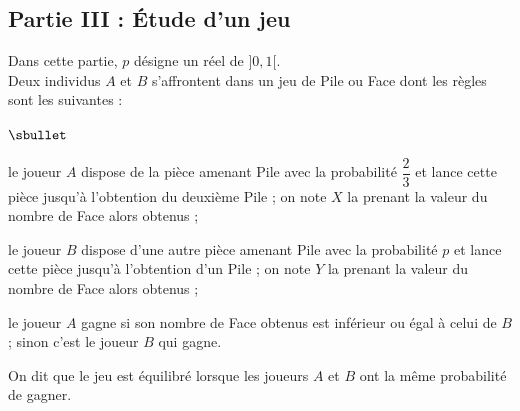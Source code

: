 \subsection*{Partie III : Étude d'un jeu}

\noindent
Dans cette partie, $p$ désigne un réel de $]0,1[$.\\[.1cm]
Deux individus $A$ et $B$ s'affrontent dans un jeu de Pile ou Face dont 
les règles sont les suivantes :
\begin{noliste}{$\sbullet$}
  \item le joueur $A$ dispose de la pièce amenant Pile avec la 
  probabilité $\dfrac{2}{3}$ et lance cette pièce jusqu'à l'obtention 
  du deuxième Pile ; on note $X$ la \var prenant la 
  valeur du nombre de Face alors obtenus ;
  
  \item le joueur $B$ dispose d'une autre pièce amenant Pile avec la
  probabilité $p$ et lance cette pièce jusqu'à l'obtention d'un Pile ;
  on note $Y$ la \var prenant la valeur du nombre de 
  Face alors obtenus ;
  
  \item le joueur $A$ gagne si son nombre de Face obtenus est inférieur
  ou égal à celui de $B$ ; sinon c'est le joueur $B$ qui gagne.
\end{noliste}
On dit que le jeu est équilibré lorsque les joueurs $A$ et $B$ ont la 
même probabilité de gagner.


